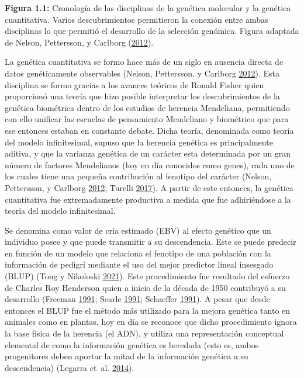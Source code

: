 \documentclass[11pt,spanish,a4paper,oneside,]{book} %
\begin{document}
\begin{center}
\textbf{Figura 1.1:} Cronología de las disciplinas de la genética molecular y la genética cuantitativa. Varios descubrimientos permitieron la conexión entre ambas disciplinas lo que permitió el desarrollo de la selección genómica. Figura adaptada de Nelson, Pettersson, y Carlborg (\protect\hyperlink{ref-cite:2}{2012}).

\end{center}

La genética cuantitativa se formo hace más de un siglo en ausencia directa de datos genéticamente observables (Nelson, Pettersson, y Carlborg \protect\hyperlink{ref-cite:2}{2012}). Esta disciplina se formo gracias a los avances teóricos de Ronald Fisher quien proporcionó una teoría que hizo posible interpretar los descubrimientos de la genética biométrica dentro de los estudios de herencia Mendeliana, permitiendo con ello unificar las escuelas de pensamiento Mendeliano y biométrico que para ese entonces estaban en constante debate. Dicha teoría, denominada como teoría del modelo infinitesimal, supuso que la herencia genética es principalmente aditiva, y que la varianza genética de un carácter esta determinada por un gran número de factores Mendelianos (hoy en día conocidos como genes), cada uno de los cuales tiene una pequeña contribución al fenotipo del carácter (Nelson, Pettersson, y Carlborg \protect\hyperlink{ref-cite:2}{2012}; Turelli \protect\hyperlink{ref-cite:9}{2017}). A partir de este entonces, la genética cuantitativa fue extremadamente productiva a medida que fue adhiriéndose a la teoría del modelo infinitesimal.

Se denomina como valor de cría estimado (EBV) al efecto genético que un individuo posee y que puede transmitir a su descendencia. Este se puede predecir en función de un modelo que relaciona el fenotipo de una población con la información de pedigrí mediante el uso del mejor predictor lineal insesgado (BLUP) (Tong y Nikoloski \protect\hyperlink{ref-cite:7}{2021}). Este procedimiento fue resultado del esfuerzo de Charles Roy Henderson quien a inicio de la década de 1950 contribuyó a su desarrollo (Freeman \protect\hyperlink{ref-cite:28}{1991}; Searle \protect\hyperlink{ref-cite:29}{1991}; Schaeffer \protect\hyperlink{ref-cite:27}{1991}). A pesar que desde entonces el BLUP fue el método más utilizado para la mejora genética tanto en animales como en plantas, hoy en día se reconoce que dicho procedimiento ignora la base física de la herencia (el ADN), y utiliza una representación conceptual elemental de como la información genética es heredada (esto es, ambos progenitores deben aportar la mitad de la información genética a su descendencia) (Legarra et~al. \protect\hyperlink{ref-cite:15}{2014}).
\end{document}
